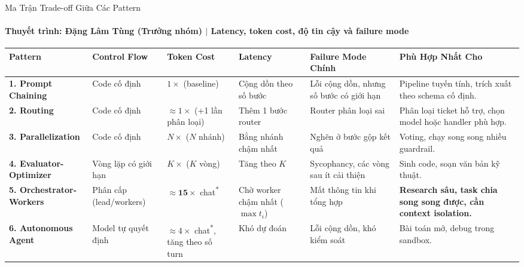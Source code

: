\documentclass[aspectratio=1610,10pt,xcolor={table}]{beamer}
\begin{document}

\begin{frame}{Ma Trận Trade-off Giữa Các Pattern}
  \framesubtitle{Thuyết trình: Đặng Lâm Tùng (Trưởng nhóm) $\vert$ Latency, token cost, độ tin cậy và failure mode}

  \centering\tiny
  \setlength{\tabcolsep}{3pt}\renewcommand{\arraystretch}{1.1}
  \begin{tabularx}{\textwidth}{>{\raggedright\arraybackslash}p{2.3cm}>{\raggedright\arraybackslash}p{1.8cm}>{\raggedright\arraybackslash}p{1.9cm}>{\raggedright\arraybackslash}p{2.0cm}>{\raggedright\arraybackslash}X>{\raggedright\arraybackslash}X}
    \toprule
    \textbf{Pattern} & \textbf{Control Flow} & \textbf{Token Cost} & \textbf{Latency} & \textbf{Failure Mode Chính} & \textbf{Phù Hợp Nhất Cho} \\
    \midrule
    \textbf{1. Prompt Chaining} & Code cố định & $1\times$ (baseline) & Cộng dồn theo số bước & Lỗi cộng dồn, nhưng số bước có giới hạn & Pipeline tuyến tính, trích xuất theo schema cố định. \\
    \addlinespace
    \textbf{2. Routing} & Code cố định & $\approx 1\times$ (+1 lần phân loại) & Thêm 1 bước router & Router phân loại sai & Phân loại ticket hỗ trợ, chọn model hoặc handler phù hợp. \\
    \addlinespace
    \textbf{3. Parallelization} & Code cố định & $N\times$ ($N$ nhánh) & Bằng nhánh chậm nhất & Nghẽn ở bước gộp kết quả & Voting, chạy song song nhiều guardrail. \\
    \addlinespace
    \textbf{4. Evaluator-Optimizer} & Vòng lặp có giới hạn & $K\times$ ($K$ vòng) & Tăng theo $K$ & Sycophancy, các vòng sau ít cải thiện & Sinh code, soạn văn bản kỹ thuật. \\
    \addlinespace
    \textbf{5. Orchestrator-Workers} & Phân cấp (lead/workers) & $\mathbf{\approx 15\times}$ chat\textsuperscript{*} & Chờ worker chậm nhất ($\max t_i$) & Mất thông tin khi tổng hợp & \textbf{Research sâu, task chia song song được, cần context isolation.} \\
    \addlinespace
    \textbf{6. Autonomous Agent} & Model tự quyết định & $\approx 4\times$ chat\textsuperscript{*}, tăng theo số turn & Khó dự đoán & Lỗi cộng dồn, khó kiểm soát & Bài toán mở, debug trong sandbox. \\
    \bottomrule
  \end{tabularx}


\end{frame}
\end{document}
